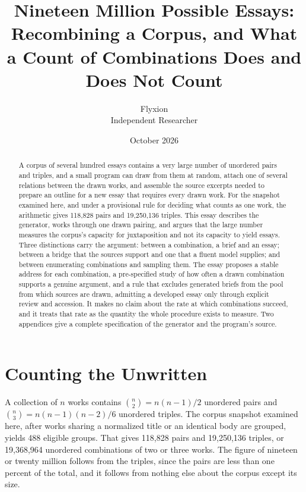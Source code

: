 \documentclass[11pt]{article}
\title{Nineteen Million Possible Essays:\\[0.3em]
\large Recombining a Corpus, and What a Count of Combinations Does and Does Not Count}
\author{Flyxion\\Independent Researcher}
\date{October 2026}
\begin{document}
\maketitle

\begin{abstract}
\noindent A corpus of several hundred essays contains a very large number of unordered pairs and triples, and a small program can draw from them at random, attach one of several relations between the drawn works, and assemble the source excerpts needed to prepare an outline for a new essay that requires every drawn work. For the snapshot examined here, and under a provisional rule for deciding what counts as one work, the arithmetic gives 118,828 pairs and 19,250,136 triples. This essay describes the generator, works through one drawn pairing, and argues that the large number measures the corpus's capacity for juxtaposition and not its capacity to yield essays. Three distinctions carry the argument: between a combination, a brief and an essay; between a bridge that the sources support and one that a fluent model supplies; and between enumerating combinations and sampling them. The essay proposes a stable address for each combination, a pre-specified study of how often a drawn combination supports a genuine argument, and a rule that excludes generated briefs from the pool from which sources are drawn, admitting a developed essay only through explicit review and accession. It makes no claim about the rate at which combinations succeed, and it treats that rate as the quantity the whole procedure exists to measure. Two appendices give a complete specification of the generator and the program's source.
\end{abstract}

\section{Counting the Unwritten}

A collection of $n$ works contains $\binom{n}{2}=n(n-1)/2$ unordered pairs and $\binom{n}{3}=n(n-1)(n-2)/6$ unordered triples. The corpus snapshot examined here, after works sharing a normalized title or an identical body are grouped, yields 488 eligible groups. That gives 118,828 pairs and 19,250,136 triples, or 19,368,964 unordered combinations of two or three works. The figure of nineteen or twenty million follows from the triples, since the pairs are less than one percent of the total, and it follows from nothing else about the corpus except its size.
\end{document}
